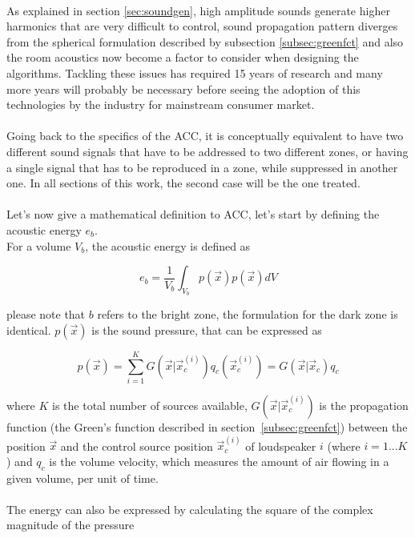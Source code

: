 \\
As explained in section \ref{sec:soundgen}, high amplitude sounds generate higher harmonics that are very difficult to control, sound propagation pattern diverges from the spherical formulation described by subsection \ref{subsec:greenfct} and also the room acoustics now become a factor to consider when designing the algorithms. Tackling these issues has required 15 years of research and many more years will probably be necessary before seeing the adoption of this technologies by the industry for mainstream consumer market.
\\
\\
Going back to the specifics of the ACC, it is conceptually equivalent to have two different sound signals that have to be addressed to two different zones, or having a single signal that has to be reproduced in a zone, while suppressed in another one. In all sections of this work, the second case will be the one treated.
\\
\\
Let's now give a mathematical definition to ACC, let's start by defining the acoustic energy $e_b$.
\\
For a volume $V_b$, the acoustic energy is defined as

\begin{equation}
e_b=\frac{1}{V_b}\int_{V_b}p(\vec{x}) p(\vec{x}) dV
\label{eqn:acousticenergy}
\end{equation}

please note that $b$ refers to the bright zone, the formulation for the dark zone is identical. $p(\vec{x})$ is the sound pressure, that can be expressed \parencite{choi_generation_2002} as

\begin{equation}
p(\vec{x})=\sum\limits_{i=1}^K \textit{G}(\vec{x}|\vec{x}_c^{(i)})q_c(\vec{x}_c^{(i)}) = G(\vec{x}|\vec{x}_c)q_c
\label{eqn:soundpressure}
\end{equation}

where $K$ is the total number of sources available, $\textit{G}(\vec{x}|\vec{x}_c^{(i)})$ is the propagation function (the Green's function described in section~\ref{subsec:greenfct}) between the position $\vec{x}$ and the control source position $\vec{x}_c^{(i)}$ of loudspeaker $i$ (where $i=1...K$) and $q_c$ is the volume velocity, which measures the amount of air flowing in a given volume, per unit of time.
\\
\\
The energy can also be expressed by calculating the square of the complex magnitude of the pressure

